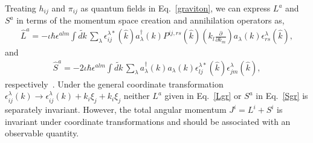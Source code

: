 \documentclass[aps,prd]{revtex4-2}
\begin{document}
Treating $h_{ij}$ and $\pi_{ij}$ as quantum fields in Eq.~\eqref{graviton}, we can express $L^a$ and $S^a$ in terms of the momentum space creation and annihilation operators as,
\begin{eqnarray}\label{Lgr}
  \hat  L^a=-\iota \hbar \epsilon^{alm} \int \widetilde {dk}\, \sum_{\lambda}   \epsilon^{\lambda *}_{ij}(\hat k) a_\lambda ^\dagger(k) P^{ij,rs}(\hat k) \left( k_{l} \frac{\partial}{\partial k_{m}}\right)a_\lambda (k)  \epsilon^{\lambda }_{rs}(\hat k),
\end{eqnarray}
and 
\begin{eqnarray}\label{Sgr}
 \hat   S^a=-2\iota \hbar \epsilon^{alm} \int \widetilde{dk}\, \sum_{\lambda} a_{\lambda}^\dagger(k)  a_\lambda (k) \epsilon^{\lambda*}_{lj}(\hat k)\epsilon_{jm}^\lambda(\hat k),
\end{eqnarray}
respectively~\cite{Maggiore:2007ulw, Manohar:2022dea, DiVecchia:2022owy}. Under the general coordinate transformation $\epsilon^\lambda_{ij}(k)\rightarrow  \epsilon^\lambda_{ij}(k) +k_i \xi_j + k_i \xi_j   $ neither $L^a$ given in Eq.~\eqref{Lgr} or $S^a$  in Eq.~\eqref{Sgr} is separately invariant. However, the total angular momentum $J^i= L^i+ S^i$ is invariant under coordinate transformations \cite{Maggiore:2007ulw} and should be associated with an observable quantity.
\end{document}
